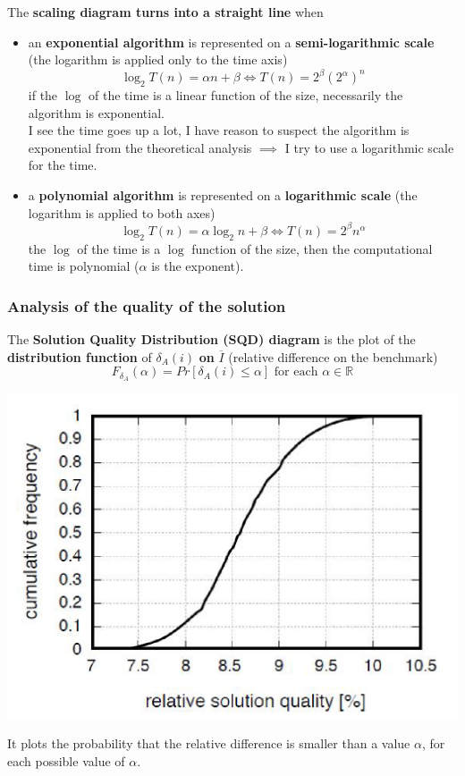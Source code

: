 \documentclass[11pt]{article}
\begin{document}
	The \textbf{scaling diagram turns into a straight line} when
	\begin{itemize}
		\item an \textbf{exponential algorithm} is represented on a \textbf{semi-logarithmic scale} (the logarithm is applied only to the time axis)
		$$ \log_2 T(n) = \alpha n + \beta \Leftrightarrow T(n) = 2^\beta \left(2^\alpha\right)^n $$
		if the $\log$ of the time is a linear function of the size, necessarily the algorithm is exponential.\\
		I see the time goes up a lot, I have reason to suspect the algorithm is exponential from the theoretical analysis $\implies$ I try to use a logarithmic scale for the time.\\
		
		\item a \textbf{polynomial algorithm} is represented on a \textbf{logarithmic scale} (the logarithm is applied to both axes)
		$$ \log_2 T(n) = \alpha\log_2 n + \beta \Leftrightarrow T(n) = 2^\beta n^\alpha $$
		the $\log$ of the time is a $\log$ function of the size, then the computational time is polynomial ($\alpha$ is the exponent).\\
	\end{itemize}
	
	\newpage
	
	\subsubsection{Analysis of the quality of the solution}
	The \textbf{Solution Quality Distribution (SQD) diagram} is the plot of the \textbf{distribution function} of $\delta_A (i)$ \textbf{on} $\overline{I}$ (relative difference on the benchmark)
	$$ F_{\delta_A} (\alpha) = Pr \left[\delta_A (i) \leq \alpha\right] \text{ for each } \alpha \in \mathbb{R} $$
	\begin{center}
		\includegraphics[width=0.7\columnwidth]{img/SQD1}
	\end{center}
	It plots the probability that the relative difference is smaller than a value $\alpha$, for each possible value of $\alpha$. \\
	
\end{document}
